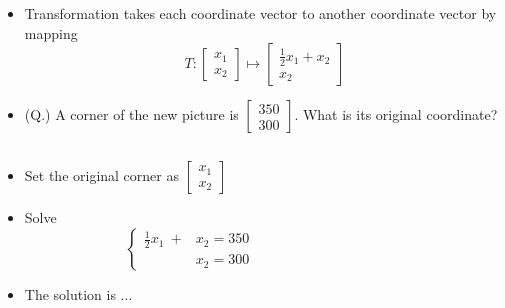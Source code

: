 \documentclass{beamer}
\theoremstyle{definition}
\theoremstyle{theorem}
\begin{document}
\begin{frame}
 
\begin{itemize}
 \item Transformation takes each coordinate vector to another coordinate vector by mapping
 $$ T:
\begin{bmatrix}
 x_{1}\\x_{2}
\end{bmatrix}
\mapsto 
\begin{bmatrix}
 \frac 1 2 x_{1} + x_{2}
 \\x_{2}
\end{bmatrix}
$$

\item (Q.) 
A corner of the new picture is
$\begin{bmatrix}
 350\\ 300
\end{bmatrix}$.
What is its original coordinate?
\end{itemize}
\end{frame}



 \begin{frame}%
\begin{columns}
    \begin{column}{0.5\textwidth}
        
\begin{itemize}
 \item Set the original corner as 
 $\begin{bmatrix}
 x_{1}\\x_{2}
\end{bmatrix}$
\item Solve
\begin{equation*}
 \label{eq:01}
\left\{
\begin{array}
 {ll}
\frac 1 2 x_{1}  \ + & x_{2} = 350 \\
& x_{2} = 300
\end{array}
\right.
\end{equation*}
 \item The solution is ...
\end{itemize}   
\end{column}
    \begin{column}{0.5\textwidth}
    \end{column}
\end{columns}
\end{frame}
\end{document}
